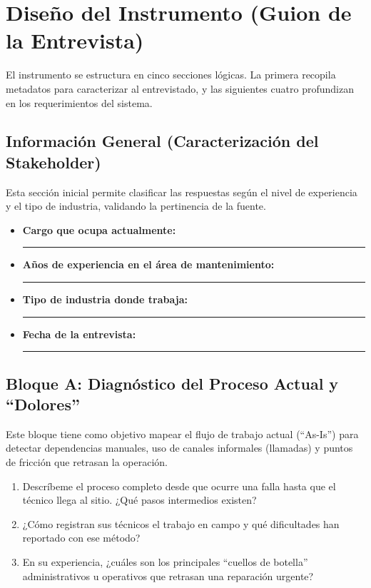 \documentclass[12pt, a4paper]{article}
\begin{document}
\section{Diseño del Instrumento (Guion de la Entrevista)}

El instrumento se estructura en cinco secciones lógicas. La primera recopila metadatos para caracterizar al entrevistado, y las siguientes cuatro profundizan en los requerimientos del sistema.

\subsection{Información General (Caracterización del Stakeholder)}
Esta sección inicial permite clasificar las respuestas según el nivel de experiencia y el tipo de industria, validando la pertinencia de la fuente.

\begin{itemize}
    \item \textbf{Cargo que ocupa actualmente:} \rule{5cm}{0.4pt}
    \item \textbf{Años de experiencia en el área de mantenimiento:} \rule{5cm}{0.4pt}
    \item \textbf{Tipo de industria donde trabaja:} \rule{5cm}{0.4pt}
    \item \textbf{Fecha de la entrevista:} \rule{5cm}{0.4pt}
\end{itemize}

\subsection{Bloque A: Diagnóstico del Proceso Actual y ``Dolores''}
Este bloque tiene como objetivo mapear el flujo de trabajo actual (``As-Is'') para detectar dependencias manuales, uso de canales informales (llamadas) y puntos de fricción que retrasan la operación.

\begin{enumerate}
    \item Descríbeme el proceso completo desde que ocurre una falla hasta que el técnico llega al sitio. ¿Qué pasos intermedios existen?
    \item ¿Cómo registran sus técnicos el trabajo en campo y qué dificultades han reportado con ese método?
    \item En su experiencia, ¿cuáles son los principales ``cuellos de botella'' administrativos u operativos que retrasan una reparación urgente?
\end{enumerate}
\end{document}
